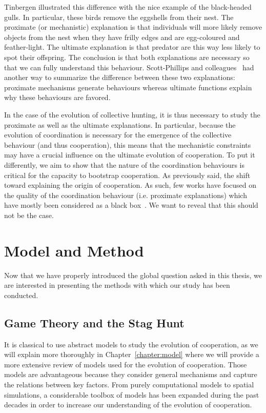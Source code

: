     Tinbergen illustrated this difference with the nice example of the black-headed gulls. In particular, these birds remove the eggshells from their nest. The proximate (or mechanistic) explanation is that individuals will more likely remove objects from the nest when they have frilly edges and are egg-coloured and feather-light. The ultimate explanation is that predator are this way less likely to spot their offspring. The conclusion is that both explanations are necessary so that we can fully understand this behaviour. Scott-Phillips and colleagues~\parencite{Scott-Phillips2011} had another way to summarize the difference between these two explanations: proximate mechanisms generate behaviours whereas ultimate functions explain why these behaviours are favored.

    In the case of the evolution of collective hunting, it is thus necessary to study the proximate as well as the ultimate explanations. In particular, because the evolution of coordination is necessary for the emergence of the collective behaviour (and thus cooperation), this means that the mechanistic constraints may have a crucial influence on the ultimate evolution of cooperation. To put it differently, we aim to show that the nature of the coordination behaviours is critical for the capacity to bootstrap cooperation. As previously said, the shift toward explaining the origin of cooperation. As such, few works have focused on the quality of the coordination behaviour (i.e. proximate explanations) which have mostly been considered as a black box~\parencite{Calcott2007a}. We want to reveal that this should not be the case.




\section{Model and Method}

  Now that we have properly introduced the global question asked in this thesis, we are interested in presenting the methods with which our study has been conducted.
  
  \subsection{Game Theory and the Stag Hunt}

    It is classical to use abstract models to study the evolution of cooperation, as we will explain more thoroughly in Chapter~\ref{chapter:model} where we will provide a more extensive review of models used for the evolution of cooperation. Those models are advantageous because they consider general mechanisms and capture the relations between key factors. From purely computational models to spatial simulations, a considerable toolbox of models has been expanded during the past decades in order to increase our understanding of the evolution of cooperation.

